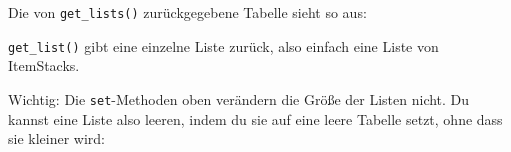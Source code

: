 Die von \texttt{get\_\allowbreak{}lists()} zurückgegebene Tabelle sieht
so aus:

\begin{Shaded}
\begin{Highlighting}[]
\OperatorTok{\{}
     \OperatorTok{=} \OperatorTok{\{}
        \OperatorTok{,}
        \OperatorTok{,}
        \OperatorTok{,}
        \OperatorTok{,}
    \OperatorTok{\},}
     \OperatorTok{=} \OperatorTok{\{}
        \OperatorTok{,}
        \OperatorTok{,}
        \OperatorTok{,}
        \OperatorTok{,}
    \OperatorTok{\},}
\OperatorTok{\},}
\end{Highlighting}
\end{Shaded}

\texttt{get\_\allowbreak{}list()} gibt eine einzelne Liste zurück, also
einfach eine Liste von ItemStacks.

Wichtig: Die \texttt{set}-Methoden oben verändern die Größe der Listen
nicht. Du kannst eine Liste also leeren, indem du sie auf eine leere
Tabelle setzt, ohne dass sie kleiner wird:

\begin{Shaded}
\begin{Highlighting}[]
\OperatorTok{:}\OperatorTok{(}\OperatorTok{,} \OperatorTok{\{\})}
\end{Highlighting}
\end{Shaded}
